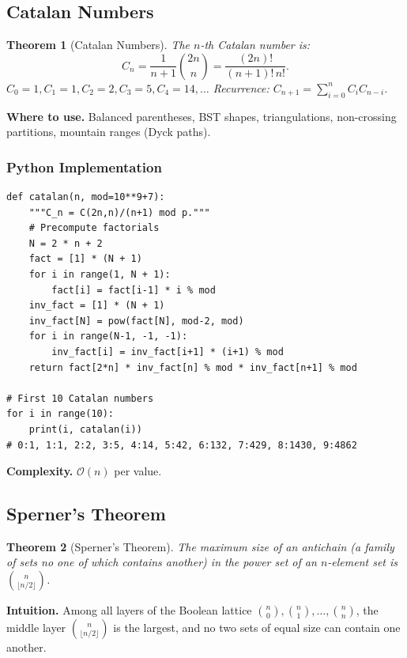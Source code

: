 \documentclass[10pt,a4paper]{article}
\theoremstyle{cpstyle}
\newtheorem{theorem}{Theorem}[section]
\newcommand{\bigO}[1]{\mathcal{O}\!\left(#1\right)}
\begin{document}
\subsection{Catalan Numbers}

\begin{theorem}[Catalan Numbers]
The $n$-th Catalan number is:
\[
  C_n = \frac{1}{n+1}\binom{2n}{n} = \frac{(2n)!}{(n+1)!\,n!}.
\]
$C_0=1, C_1=1, C_2=2, C_3=5, C_4=14, \ldots$
Recurrence: $C_{n+1} = \sum_{i=0}^n C_i C_{n-i}$.
\end{theorem}

\textbf{Where to use.} Balanced parentheses, BST shapes, triangulations, non-crossing partitions, mountain ranges (Dyck paths).

\subsubsection{Python Implementation}
\begin{lstlisting}[caption={Catalan Numbers mod p}]
def catalan(n, mod=10**9+7):
    """C_n = C(2n,n)/(n+1) mod p."""
    # Precompute factorials
    N = 2 * n + 2
    fact = [1] * (N + 1)
    for i in range(1, N + 1):
        fact[i] = fact[i-1] * i % mod
    inv_fact = [1] * (N + 1)
    inv_fact[N] = pow(fact[N], mod-2, mod)
    for i in range(N-1, -1, -1):
        inv_fact[i] = inv_fact[i+1] * (i+1) % mod
    return fact[2*n] * inv_fact[n] % mod * inv_fact[n+1] % mod

# First 10 Catalan numbers
for i in range(10):
    print(i, catalan(i))
# 0:1, 1:1, 2:2, 3:5, 4:14, 5:42, 6:132, 7:429, 8:1430, 9:4862
\end{lstlisting}

\textbf{Complexity.} $\bigO{n}$ per value.

\subsection{Sperner's Theorem}

\begin{theorem}[Sperner's Theorem]
The maximum size of an antichain (a family of sets no one of which contains another) in the power set of an $n$-element set is $\binom{n}{\lfloor n/2 \rfloor}$.
\end{theorem}

\textbf{Intuition.} Among all layers of the Boolean lattice $\binom{n}{0}, \binom{n}{1}, \ldots, \binom{n}{n}$, the middle layer $\binom{n}{\lfloor n/2 \rfloor}$ is the largest, and no two sets of equal size can contain one another.
\end{document}
